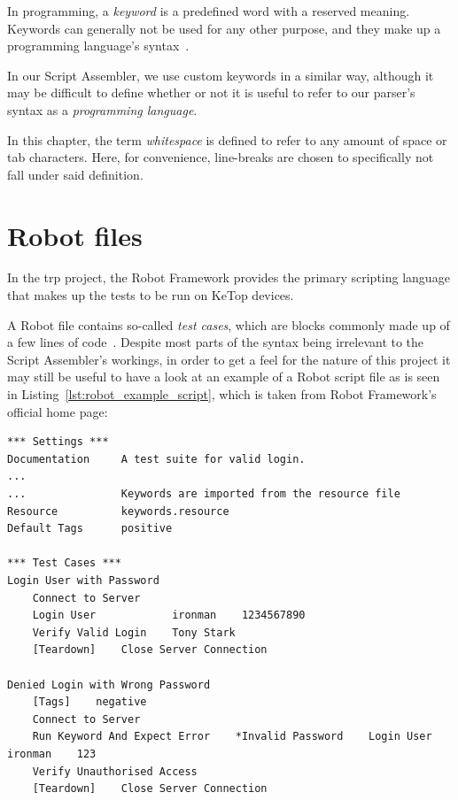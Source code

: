 
In programming, a \textit{keyword} is a predefined word with a reserved meaning. Keywords can generally not be used for any other purpose, and they make up a programming language's syntax~\cite{keyword}.

In our Script Assembler, we use custom keywords in a similar way, although it may be difficult to define whether or not it is useful to refer to our parser's syntax as a \textit{programming language}. 

In this chapter, the term \textit{whitespace} is defined to refer to any amount of space or tab characters. Here, for convenience, line-breaks are chosen to specifically not fall under said definition.

\section{Robot files}

In the \gls{trp} project, the Robot Framework provides the primary scripting language that makes up the tests to be run on KeTop devices. 

A Robot file contains so-called \textit{test cases}, which are blocks commonly made up of a few lines of code~\cite{robot-framework}. Despite most parts of the syntax being irrelevant to the Script Assembler's workings, in order to get a feel for the nature of this project it may still be useful to have a look at an example of a Robot script file as is seen in Listing~\ref{lst:robot_example_script}, which is taken from Robot Framework's official home page:

\begin{lstlisting}[caption={Example code of a Robot script file~\cite{robot-framework}.}, label={lst:robot_example_script}]
*** Settings ***
Documentation     A test suite for valid login.
...
...               Keywords are imported from the resource file
Resource          keywords.resource
Default Tags      positive

*** Test Cases ***
Login User with Password
    Connect to Server
    Login User            ironman    1234567890
    Verify Valid Login    Tony Stark
    [Teardown]    Close Server Connection

Denied Login with Wrong Password
    [Tags]    negative
    Connect to Server
    Run Keyword And Expect Error    *Invalid Password    Login User    ironman    123
    Verify Unauthorised Access
    [Teardown]    Close Server Connection
\end{lstlisting}

